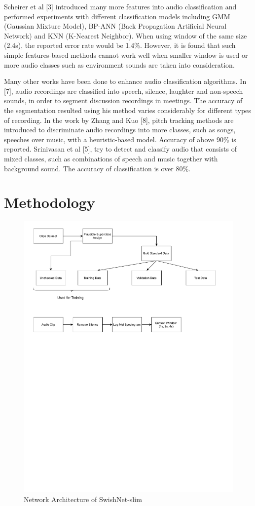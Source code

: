 \documentclass{article}
\begin{document}
Scheirer et al [3] introduced many more features into audio classification and performed experiments with different classification models including GMM (Gaussian Mixture Model), BP-ANN (Back Propagation Artificial Neural Network) and KNN (K-Nearest Neighbor). When using window of the same size (2.4s), the reported error rate would be 1.4\%. However, it is found that such simple features-based methods cannot work well when smaller window is used or more audio classes such as environment sounds are taken into consideration.  

Many other works have been done to enhance audio classification algorithms. In [7], audio recordings are classified into speech, silence, laughter and non-speech sounds, in order to segment discussion recordings in meetings. The accuracy of the segmentation resulted using his method varies considerably for different types of recording. In the work by Zhang and Kuo [8], pitch tracking methods are introduced to discriminate audio recordings into more classes, such as songs, speeches over music, with a heuristic-based model. Accuracy of above 90\% is reported. Srinivasan et al [5], try to detect and classify audio that consists of mixed classes, such as combinations of speech and music together with background sound. The accuracy of classification is over 80\%. 

\section{Methodology}
\begin{figure}[!t]
	\centering
	\includegraphics[width=\textwidth, trim= 0 450 0 0, clip]{Pipeline.pdf}
	\caption{Network Architecture of SwishNet-slim}
	\label{fig:swishnet}
\end{figure}
\end{document}
